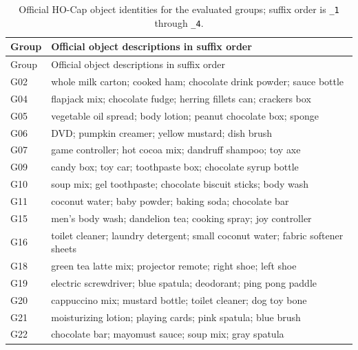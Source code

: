 \begin{longtable}{lp{100mm}}
\caption{Official HO-Cap object identities for the evaluated groups; suffix order is \texttt{\_1} through \texttt{\_4}.}\label{tab:hocap-object-catalog}\\
\toprule Group & Official object descriptions in suffix order \\
\midrule\endfirsthead
\toprule Group & Official object descriptions in suffix order \\
\midrule\endhead
G02 & whole milk carton; cooked ham; chocolate drink powder; sauce bottle \\
G04 & flapjack mix; chocolate fudge; herring fillets can; crackers box \\
G05 & vegetable oil spread; body lotion; peanut chocolate box; sponge \\
G06 & DVD; pumpkin creamer; yellow mustard; dish brush \\
G07 & game controller; hot cocoa mix; dandruff shampoo; toy axe \\
G09 & candy box; toy car; toothpaste box; chocolate syrup bottle \\
G10 & soup mix; gel toothpaste; chocolate biscuit sticks; body wash \\
G11 & coconut water; baby powder; baking soda; chocolate bar \\
G15 & men's body wash; dandelion tea; cooking spray; joy controller \\
G16 & toilet cleaner; laundry detergent; small coconut water; fabric softener sheets \\
G18 & green tea latte mix; projector remote; right shoe; left shoe \\
G19 & electric screwdriver; blue spatula; deodorant; ping pong paddle \\
G20 & cappuccino mix; mustard bottle; toilet cleaner; dog toy bone \\
G21 & moisturizing lotion; playing cards; pink spatula; blue brush \\
G22 & chocolate bar; mayomust sauce; soup mix; gray spatula \\
\bottomrule
\end{longtable}
